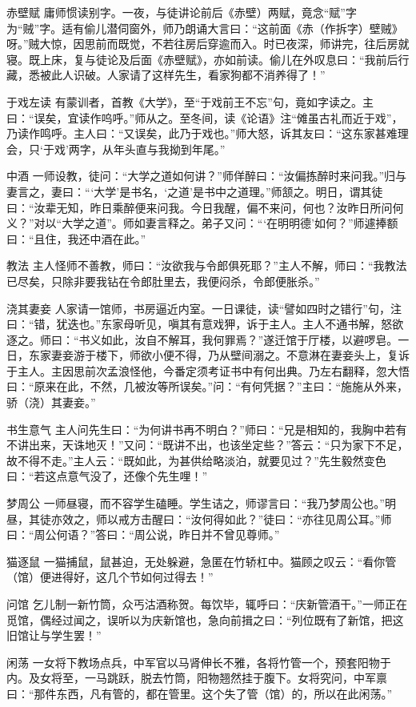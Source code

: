 \documentclass[12pt,UTF8]{ctexbook}
\begin{document}
赤壁赋
庸师惯读别字。一夜，与徒讲论前后《赤壁）两赋，竟念“赋”字为“贼”字。适有偷儿潜伺窗外，师乃朗诵大言曰：“这前面《赤（作拆字）壁贼》呀。”贼大惊，因思前而既觉，不若往房后穿逾而入。时已夜深，师讲完，往后房就寝。既上床，复与徒论及后面《赤壁赋》，亦如前读。偷儿在外叹息曰：“我前后行藏，悉被此人识破。人家请了这样先生，看家狗都不消养得了！”

于戏左读
有蒙训者，首教《大学》，至“于戏前王不忘”句，竟如字读之。主曰：“误矣，宜读作呜呼。”师从之。至冬间，读《论语》注“傩虽古礼而近于戏”，乃读作鸣呼。主人曰：“又误矣，此乃于戏也。”师大怒，诉其友曰：“这东家甚难理会，只‘于戏’两字，从年头直与我拗到年尾。”

中酒
一师设教，徒问：“大学之道如何讲？”师佯醉曰：“汝偏拣醉时来问我。”归与妻言之，妻曰：“‘大学’是书名，‘之道’是书中之道理。”师颔之。明日，谓其徒曰：“汝辈无知，昨日乘醉便来问我。今日我醒，偏不来问，何也？汝昨日所问何义？”对以“大学之道”。师如妻言释之。弟子又问：“‘在明明德’如何？”师遽捧额曰：“且住，我还中酒在此。”

教法
主人怪师不善教，师曰：“汝欲我与令郎俱死耶？”主人不解，师曰：“我教法已尽矣，只除非要我钻在令郎肚里去，我便闷杀，令郎便胀杀。”

浇其妻妾
人家请一馆师，书房逼近内室。一日课徒，读“譬如四时之错行”句，注曰：“错，犹迭也。”东家母听见，嗔其有意戏狎，诉于主人。主人不通书解，怒欲逐之。师曰：“书义如此，汝自不解耳，我何罪焉？”遂迁馆于厅楼，以避啰皂。一日，东家妻妾游于楼下，师欲小便不得，乃从壁间溺之。不意淋在妻妾头上，复诉于主人。主因思前次孟浪怪他，今番定须考证书中有何出典。乃左右翻释，忽大悟曰：“原来在此，不然，几被汝等所误矣。”问：“有何凭据？”主曰：“施施从外来，骄（浇）其妻妾。”

书生意气
主人问先生曰：“为何讲书再不明白？”师曰：“兄是相知的，我胸中若有不讲出来，天诛地灭！”又问：“既讲不出，也该坐定些？”答云：“只为家下不足，故不得不走。”主人云：“既如此，为甚供给略淡泊，就要见过？”先生毅然变色曰：“若这点意气没了，还像个先生哩！”

梦周公
一师昼寝，而不容学生磕睡。学生诘之，师谬言曰：“我乃梦周公也。”明昼，其徒亦效之，师以戒方击醒曰：“汝何得如此？”徒曰：“亦往见周公耳。”师曰：“周公何语？”答曰：“周公说，昨日并不曾见尊师。”

猫逐鼠
一猫捕鼠，鼠甚迫，无处躲避，急匿在竹轿杠中。猫顾之叹云：“看你管（馆）便进得好，这几个节如何过得去！”

问馆
乞儿制一新竹筒，众丐沽酒称贺。每饮毕，辄呼曰：“庆新管酒干。”一师正在觅馆，偶经过闻之，误听以为庆新馆也，急向前揖之曰：“列位既有了新馆，把这旧馆让与学生罢！”

闲荡
一女将下教场点兵，中军官以马肾伸长不雅，各将竹管一个，预套阳物于内。及女将至，一马跳跃，脱去竹筒，阳物翘然挂于腹下。女将究问，中军禀曰：“那件东西，凡有管的，都在管里。这个失了管（馆）的，所以在此闲荡。”
\end{document}
